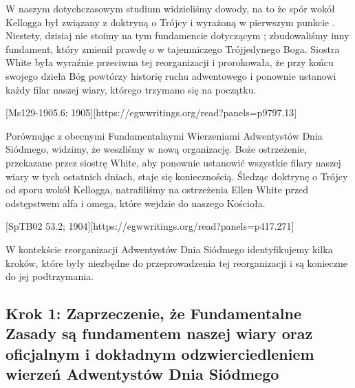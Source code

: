 
W naszym dotychczasowym studium widzieliśmy dowody, na to że spór wokół Kellogga był związany z doktryną o Trójcy i  wyrażoną w pierwszym punkcie . Niestety, dzisiaj nie stoimy na tym fundamencie dotyczącym ; zbudowaliśmy inny fundament, który zmienił prawdę o  w tajemniczego Trójjedynego Boga. Siostra White była wyraźnie przeciwna tej reorganizacji i prorokowała, że przy końcu swojego dzieła Bóg powtórzy historię ruchu adwentowego i ponownie ustanowi każdy filar naszej wiary, którego trzymano się na początku.

[Ms129-1905.6; 1905][https://egwwritings.org/read?panels=p9797.13]

Porównując  z obecnymi Fundamentalnymi Wierzeniami Adwentystów Dnia Siódmego, widzimy, że weszliśmy w nową organizację. Boże ostrzeżenie, przekazane przez siostrę White, aby ponownie ustanowić wszystkie filary naszej wiary w tych ostatnich dniach, staje się koniecznością. Śledząc doktrynę o Trójcy od sporu wokół Kellogga, natrafiliśmy na ostrzeżenia Ellen White przed odstępstwem alfa i omega, które wejdzie do naszego Kościoła.

[SpTB02 53.2; 1904][https://egwwritings.org/read?panels=p417.271]

W kontekście reorganizacji Adwentystów Dnia Siódmego identyfikujemy kilka kroków, które były niezbędne do przeprowadzenia tej reorganizacji i są konieczne do jej podtrzymania.

\subsection*{Krok 1: Zaprzeczenie, że Fundamentalne Zasady są fundamentem naszej wiary oraz oficjalnym i dokładnym odzwierciedleniem wierzeń Adwentystów Dnia Siódmego}

